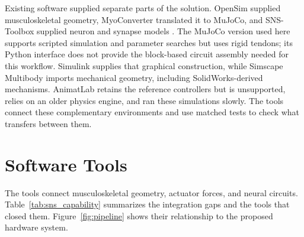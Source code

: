 Existing software supplied separate parts of the solution. OpenSim supplied musculoskeletal geometry, MyoConverter translated it to MuJoCo, and SNS-Toolbox supplied neuron and synapse models \citep{delp_opensim_2007, caggiano_myosuite_2022, todorov_mujoco_2012, nourse_sns_2023}. The MuJoCo version used here supports scripted simulation and parameter searches but uses rigid tendons; its Python interface does not provide the block-based circuit assembly needed for this workflow. Simulink supplies that graphical construction, while Simscape Multibody imports mechanical geometry, including SolidWorks-derived mechanisms. AnimatLab retains the reference controllers but is unsupported, relies on an older physics engine, and ran these simulations slowly. The tools connect these complementary environments and use matched tests to check what transfers between them.

\section{Software Tools}\label{sec:preliminary_sim_methods}

The tools connect musculoskeletal geometry, actuator forces, and neural circuits. Table~\ref{tab:sns_capability} summarizes the integration gaps and the tools that closed them. Figure~\ref{fig:pipeline} shows their relationship to the proposed hardware system.


